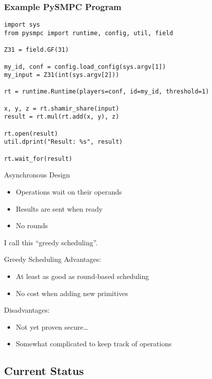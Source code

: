 \documentclass[t,noamsthm]{beamer}
\begin{document}
\begin{frame}[fragile]

\frametitle{Example PySMPC Program}

\begin{lstlisting}
import sys
from pysmpc import runtime, config, util, field

Z31 = field.GF(31)

my_id, conf = config.load_config(sys.argv[1])
my_input = Z31(int(sys.argv[2]))

rt = runtime.Runtime(players=conf, id=my_id, threshold=1)

x, y, z = rt.shamir_share(input)
result = rt.mul(rt.add(x, y), z)

rt.open(result)
util.dprint("Result: %s", result)

rt.wait_for(result)
\end{lstlisting}

\end{frame}

\begin{frame}{Asynchronous Design}
  \begin{itemize}
  \item Operations wait on their operands
  \item Results are sent when ready
  \item No rounds
  \end{itemize}
  I call this ``greedy scheduling''.
\end{frame}

\begin{frame}{Greedy Scheduling}
  Advantages:
  \begin{itemize}
  \item At least as good as round-based scheduling
  \item No cost when adding new primitives
  \end{itemize}

  Disadvantages:
  \begin{itemize}
  \item Not yet proven secure\dots
  \item Somewhat complicated to keep track of operations
  \end{itemize}
\end{frame}


\subsection{Current Status}
\end{document}
